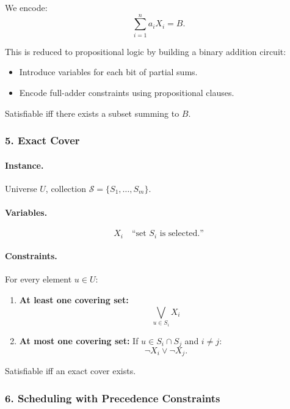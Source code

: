 \documentclass{article}
\begin{document}
We encode:
\[
\sum_{i=1}^n a_i X_i = B.
\]

This is reduced to propositional logic by building a binary addition circuit:

\begin{itemize}
    \item Introduce variables for each bit of partial sums.
    \item Encode full-adder constraints using propositional clauses.
\end{itemize}

Satisfiable iff there exists a subset summing to $B$.

\bigskip

\subsubsection*{5. Exact Cover}

\paragraph{Instance.}
Universe $U$, collection $\mathcal{S} = \{S_1,\dots,S_m\}$.

\paragraph{Variables.}
\[
X_i \quad \text{``set $S_i$ is selected.''}
\]

\paragraph{Constraints.}

For every element $u \in U$:

\begin{enumerate}
    \item \textbf{At least one covering set:}
    \[
    \bigvee_{u \in S_i} X_i
    \]
    \item \textbf{At most one covering set:}
    If $u \in S_i \cap S_j$ and $i \neq j$:
    \[
    \neg X_i \lor \neg X_j.
    \]
\end{enumerate}

Satisfiable iff an exact cover exists.

\bigskip

\subsubsection*{6. Scheduling with Precedence Constraints}
\end{document}
